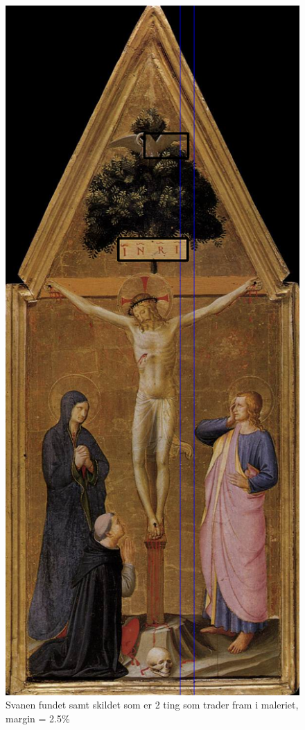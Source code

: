 \begin{figure}[h!!]
	\begin{center}
		\includegraphics[scale=0.30,angle=0]{afsnit/afprovning/billeder/BB09crucif.png}
	\end{center}
	\caption[]{Svanen fundet samt skildet som er 2 ting som trader fram
	i maleriet, margin = 2.5\%}
	\label{BB09crucif}
\end{figure}

